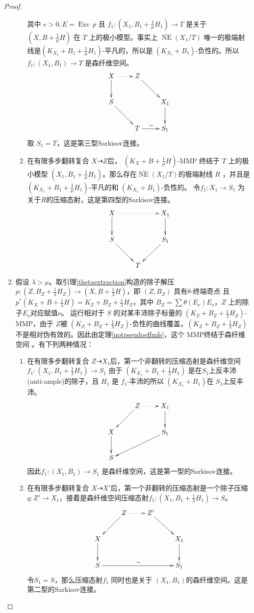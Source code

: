 \begin{proof}
\begin{enumerate}
\begin{enumerate}
            其中 $ e>0 ,E=\operatorname{Exc}\,p$ 且  $f_{1}: (X_1,B_1+\frac{1}{\mu}H_1) \to T$ 是关于 $(X,B+\frac{1}{\mu}H)$ 在 $T$ 上的极小模型。事实上  $ \overline{\operatorname{NE}}(X_1/T) $ 唯一的极端射线是$ (K_{X_1}+B_1+\frac{1}{\mu}H_1) $-平凡的，所以是 $ (K_{X_1}+B_1) $-负性的。所以 $ f_1:(X_1, B_1)\to T $ 是森纤维空间。
      \[ \xymatrix{
          X\ar@{.>}[r]\ar[d]& Z\ar[rd] \\
          S\ar[rd]& & X_{1}\ar[d]\\
               &T\ar[r]^{\sim}& S_{1} } \]
            取 $ S_1=T $，这是第三型Sarkisov连接。
      \item 在有限多步翻转复合 $ X\dashrightarrow Z $后，  $(K_{X}+B+\frac{1}{\mu}H)$-MMP 终结于 $T$ 上的极小模型 $ (X_1,B_1+\frac{1}{\mu}H_1) $。那么存在$ \overline{\operatorname{NE}}(X_1/T) $的极端射线 $R$ ，并且是 $ (K_{X_1}+B_1+\frac{1}{\mu}H_1) $-平凡的和 $ (K_{X_1}+B_1) $-负性的。
            令$ f_1:X_1\to S_1 $ 为 关于$R$的压缩态射，这是第四型的Sarkisov连接。
            \[ \xymatrix{
                X\ar@{.>}[rr]\ar[d]& &X_{1}\ar[d] \\
                S\ar[rd]& & S_{1}\ar[ld]\\
                  &T& } \]
    \end{enumerate}
  \item 假设 $\lambda>\mu$。取引理\ref{thetaextraction}构造的除子解压 $ p:(Z,B_Z+\frac{1}{\lambda}H_Z)\to (X,B+\frac{1}{\lambda}H) $，即   $ (Z,B_Z) $ 具有$ \theta $-终端奇点 且 $ p^*(K_X+B+\frac{1}{\lambda}H)=K_Z+B_Z+\frac{1}{\lambda}H_Z $，其中 $ B_Z=\sum\theta(E_{\nu})E_\nu $，$Z$ 上的除子$E_{\nu}$对应赋值$\nu$。
    运行相对于 $S$ 的对某丰沛除子标量的 $ (K_Z+B_Z+\frac{1}{\lambda}H_Z) $-MMP，由于 $Z$被 $ (K_Z+B_Z+\frac{1}{\lambda}H_Z) $-负性的曲线覆盖，$ (K_Z+B_Z+\frac{1}{\lambda}H_Z) $ 不是相对伪有效的。因此由定理\ref{notpseudoeffmfs}，这个 MMP终结于森纤维空间 。有下列两种情况：
    \begin{enumerate}
      \item 在有限多步翻转复合 $ Z\dashrightarrow X_1 $后，第一个非翻转的压缩态射是森纤维空间$f_1:(X_1,B_1+\frac{1}{\lambda}H_1)\to S_1$ 由于 $ (K_{X_1}+B_1+\frac{1}{\lambda}H_1) $ 是在$S_1$上反丰沛(anti-ample)的除子，且 $ H_1 $ 是 $ f_1 $-丰沛的所以 $(K_{X_1}+B_1) $在 $S_1$上反丰沛。
      \[ \xymatrix{
        &Z\ar@{.>}[r]\ar[ld] &X_{1}\ar[d] \\
          X\ar[d]& &S_{1}\ar[lld]\\
          S   & & } \]
        因此$ f_1:(X_1, B_1)\to S_1 $ 是森纤维空间，这是第一型的Sarkisov连接。
      \item 在有限多步翻转复合 $ X\dashrightarrow X' $后，第一个非翻转的压缩态射是一个除子压缩 $ q:Z'\to X_1 $，接着是森纤维空间压缩态射$f_1:(X_1,B_1+\frac{1}{\lambda}H_1)\to S$。
      \[ \xymatrix{
        &Z\ar@{.>}[r]\ar[ld] &Z'\ar[rd] \\
          X\ar[d]& & &X_{1}\ar[d]\\
          S\ar[rrr]^{\sim}   & & & S_{1} } \]
        令$ S_1=S $，那么压缩态射$f_1$ 同时也是关于 $(X_1, B_1)$的森纤维空间。这是第二型的Sarkisov连接。
    \end{enumerate}
  \end{enumerate}
\end{proof}
